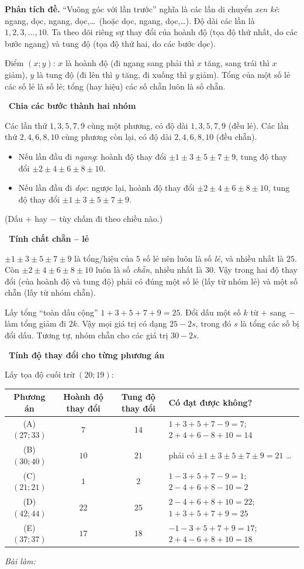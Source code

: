 \documentclass[11pt]{article}
\newif\ifsol \solfalse
\newcommand{\StuProb}[2]{\begin{probboxS}{#1}{#2}\StuProbBody\end{probboxS}}
\newcommand{\probsol}[1]{%
  \begin{lrbox}{\solmeasure}\begin{minipage}{\dimexpr\linewidth-24pt\relax}#1\end{minipage}\end{lrbox}%
  \ifsol
    \begin{solbox}#1\end{solbox}%
  \else
    \setlength{\solht}{\dimexpr\ht\solmeasure+\dp\solmeasure+0.85cm\relax}%
    \ifdim\solht<1.35cm\setlength{\solht}{1.35cm}\fi
    \ifdim\solht>\StudentMaxWork\setlength{\solht}{\StudentMaxWork}\fi
    \par\noindent\begin{minipage}{\linewidth}%
    \expandafter\StuProb\StuProbArgs
    \begin{tcolorbox}[colback=white,colframe=Line,boxrule=0.8pt,arc=5pt,
      left=8pt,right=8pt,top=4pt,bottom=4pt,height=\solht]{\footnotesize\color{Slate}\itshape\WorkWord}\end{tcolorbox}%
    \end{minipage}\par\medskip
  \fi}
\newlength{\StudentMaxWork}\setlength{\StudentMaxWork}{4.5cm}
\newcommand{\step}[2]{\par\smallskip\noindent{\bfseries\color{tmBlue!85!black}\StepWord~#1.}\ {\bfseries #2}\par\nopagebreak}
\def\WorkWord{Bài làm:}
\def\StepWord{Bước}
\begin{document}
\probsol{
\textbf{Phân tích đề.} ``Vuông góc với lần trước'' nghĩa là các lần di chuyển \emph{xen kẽ}: ngang, dọc, ngang, dọc,\dots\ (hoặc dọc, ngang, dọc,\dots). Độ dài các lần là $1,2,3,\dots,10$. Ta theo dõi riêng sự thay đổi của hoành độ (tọa độ thứ nhất, do các bước ngang) và tung độ (tọa độ thứ hai, do các bước dọc).

\begin{recallbox}Điểm $(x;y)$: $x$ là hoành độ (đi ngang sang phải thì $x$ tăng, sang trái thì $x$ giảm), $y$ là tung độ (đi lên thì $y$ tăng, đi xuống thì $y$ giảm). Tổng của một số lẻ các số lẻ là số lẻ; tổng (hay hiệu) các số chẵn luôn là số chẵn.\end{recallbox}

\step{1}{Chia các bước thành hai nhóm}
Các lần thứ $1,3,5,7,9$ cùng một phương, có độ dài $1,3,5,7,9$ (đều lẻ). Các lần thứ $2,4,6,8,10$ cùng phương còn lại, có độ dài $2,4,6,8,10$ (đều chẵn).
\begin{itemize}[leftmargin=1.4em,itemsep=1pt]
\item Nếu lần đầu đi \emph{ngang}: hoành độ thay đổi $\pm1\pm3\pm5\pm7\pm9$, tung độ thay đổi $\pm2\pm4\pm6\pm8\pm10$.
\item Nếu lần đầu đi \emph{dọc}: ngược lại, hoành độ thay đổi $\pm2\pm4\pm6\pm8\pm10$, tung độ thay đổi $\pm1\pm3\pm5\pm7\pm9$.
\end{itemize}
(Dấu $+$ hay $-$ tùy chấm đi theo chiều nào.)

\step{2}{Tính chất chẵn -- lẻ}
$\pm1\pm3\pm5\pm7\pm9$ là tổng/hiệu của $5$ số lẻ nên luôn là số \emph{lẻ}, và nhiều nhất là $25$. Còn $\pm2\pm4\pm6\pm8\pm10$ luôn là số \emph{chẵn}, nhiều nhất là $30$. Vậy trong hai độ thay đổi (của hoành độ và tung độ) phải có đúng một số lẻ (lấy từ nhóm lẻ) và một số chẵn (lấy từ nhóm chẵn).

\begin{proofbox}Lấy tổng ``toàn dấu cộng'' $1+3+5+7+9=25$. Đổi dấu một số $k$ từ $+$ sang $-$ làm tổng giảm đi $2k$. Vậy mọi giá trị có dạng $25-2s$, trong đó $s$ là tổng các số bị đổi dấu. Tương tự, nhóm chẵn cho các giá trị $30-2s$.\end{proofbox}

\step{3}{Tính độ thay đổi cho từng phương án}
Lấy tọa độ cuối trừ $(20;19)$:
\begin{center}
\small\begin{tabularx}{\linewidth}{|c|c|c|X|}
\hline
\rowcolor{Tint}\textbf{Phương án} & \textbf{Hoành độ thay đổi} & \textbf{Tung độ thay đổi} & \textbf{Có đạt được không?}\\
\hline
(A) $(27;33)$ & $7$ & $14$ & $1+3+5+7-9=7$; $2+4+6-8+10=14$ \\
(B) $(30;40)$ & $10$ & $21$ & phải có $\pm1\pm3\pm5\pm7\pm9=21$ \dots\\
(C) $(21;21)$ & $1$ & $2$ & $1-3+5+7-9=1$; $2-4+6+8-10=2$\\
(D) $(42;44)$ & $22$ & $25$ & $2-4+6+8+10=22$; $1+3+5+7+9=25$\\
(E) $(37;37)$ & $17$ & $18$ & $-1-3+5+7+9=17$; $2+4-6+8+10=18$\\
\hline
\end{tabularx}
\end{center}

}
\end{document}
